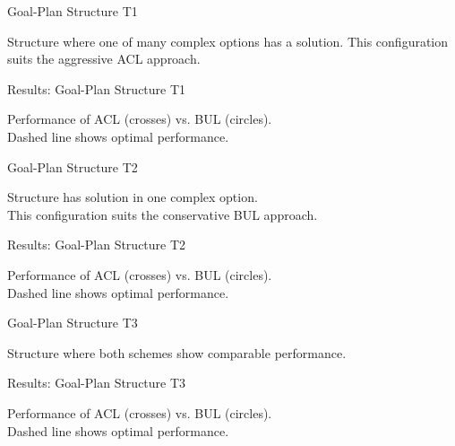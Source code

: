 \documentclass[]{beamer}
\begin{document}
\begin{frame}{Goal-Plan Structure T1}
\setcounter{framenumber}{\value{finalframe}}

\centering\resizebox{.7\paperwidth}{!}{}

Structure where one of many complex options has a solution. This configuration suits the aggressive \alert{ACL} approach.

\end{frame}

\begin{frame}{Results: Goal-Plan Structure T1}
\setcounter{framenumber}{\value{finalframe}}

\centering\resizebox{.7\paperwidth}{!}{}

Performance of ACL (crosses) vs. BUL (circles). \\Dashed line shows optimal performance.

\end{frame}

\begin{frame}{Goal-Plan Structure T2}
\setcounter{framenumber}{\value{finalframe}}

\centering\resizebox{.55\paperwidth}{!}{}

Structure has solution in one complex option. \\ This configuration suits the conservative \alert{BUL} approach.

\end{frame}

\begin{frame}{Results: Goal-Plan Structure T2}
\setcounter{framenumber}{\value{finalframe}}

\centering\resizebox{.7\paperwidth}{!}{}

Performance of ACL (crosses) vs. BUL (circles). \\Dashed line shows optimal performance.

\end{frame}

\begin{frame}{Goal-Plan Structure T3}
\setcounter{framenumber}{\value{finalframe}}

\centering\resizebox{.7\paperwidth}{!}{}

Structure where both schemes show \alert{comparable performance}.

\end{frame}

\begin{frame}{Results: Goal-Plan Structure T3}
\setcounter{framenumber}{\value{finalframe}}

\centering\resizebox{.7\paperwidth}{!}{}

Performance of ACL (crosses) vs. BUL (circles). \\Dashed line shows optimal performance.

\end{frame}
\end{document}
